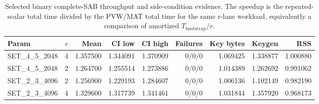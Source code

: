 
\begin{table}[t]
\centering
\small
\caption{Selected binary complete-SAB throughput and side-condition evidence. The speedup is the repeated-scalar total time divided by the PVW/MAT total time for the same r-lane workload, equivalently a comparison of amortized $T_{\mathrm{bootstrap}}/r$.}
\label{tab:selected-binary}
\begin{tabular}{lrrrrrrrr}
\toprule
Param & $r$ & Mean & CI low & CI high & Failures & Key bytes & Keygen & RSS \\
\midrule
SET\_4\_5\_2048 & 4 & 1.357500 & 1.344091 & 1.370909 & 0/0/0 & 1.069425 & 1.338877 & 1.000880 \\
SET\_4\_5\_2048 & 2 & 1.264700 & 1.255514 & 1.273886 & 0/0/0 & 1.014389 & 1.262692 & 0.991062 \\
SET\_2\_3\_4096 & 2 & 1.256900 & 1.229193 & 1.284607 & 0/0/0 & 1.006136 & 1.102149 & 0.982190 \\
SET\_2\_3\_4096 & 4 & 1.329600 & 1.317739 & 1.341461 & 0/0/0 & 1.031844 & 1.357920 & 0.968173 \\
\bottomrule
\end{tabular}
\end{table}

